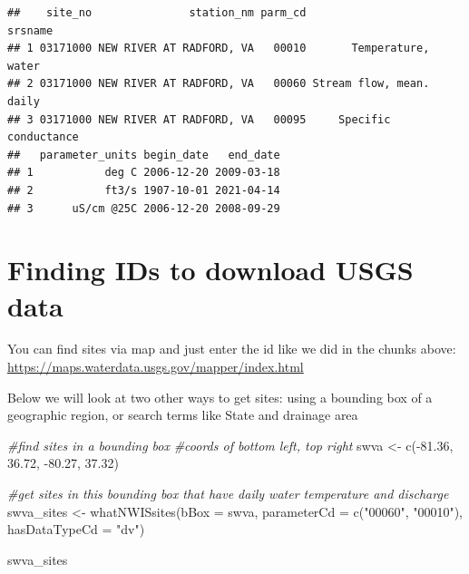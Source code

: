 \documentclass[
]{book}
\newenvironment{Shaded}{\begin{snugshade}}{\end{snugshade}}
\newcommand{\AttributeTok}[1]{\textcolor[rgb]{0.77,0.63,0.00}{#1}}
\newcommand{\CommentTok}[1]{\textcolor[rgb]{0.56,0.35,0.01}{\textit{#1}}}
\newcommand{\FloatTok}[1]{\textcolor[rgb]{0.00,0.00,0.81}{#1}}
\newcommand{\FunctionTok}[1]{\textcolor[rgb]{0.00,0.00,0.00}{#1}}
\newcommand{\NormalTok}[1]{#1}
\newcommand{\OtherTok}[1]{\textcolor[rgb]{0.56,0.35,0.01}{#1}}
\newcommand{\SpecialCharTok}[1]{\textcolor[rgb]{0.00,0.00,0.00}{#1}}
\newcommand{\StringTok}[1]{\textcolor[rgb]{0.31,0.60,0.02}{#1}}
\begin{document}
\begin{verbatim}
##    site_no               station_nm parm_cd                  srsname
## 1 03171000 NEW RIVER AT RADFORD, VA   00010       Temperature, water
## 2 03171000 NEW RIVER AT RADFORD, VA   00060 Stream flow, mean. daily
## 3 03171000 NEW RIVER AT RADFORD, VA   00095     Specific conductance
##   parameter_units begin_date   end_date
## 1           deg C 2006-12-20 2009-03-18
## 2           ft3/s 1907-10-01 2021-04-14
## 3      uS/cm @25C 2006-12-20 2008-09-29
\end{verbatim}

\hypertarget{finding-ids-to-download-usgs-data}{%
\section{Finding IDs to download USGS data}\label{finding-ids-to-download-usgs-data}}

You can find sites via map and just enter the id like we did in the chunks above: \url{https://maps.waterdata.usgs.gov/mapper/index.html}

Below we will look at two other ways to get sites: using a bounding box of a geographic region, or search terms like State and drainage area

\begin{Shaded}
\begin{Highlighting}[]
\CommentTok{\#find sites in a bounding box}
\CommentTok{\#coords of bottom left, top right}
\NormalTok{swva }\OtherTok{\textless{}{-}} \FunctionTok{c}\NormalTok{(}\SpecialCharTok{{-}}\FloatTok{81.36}\NormalTok{, }\FloatTok{36.72}\NormalTok{, }\SpecialCharTok{{-}}\FloatTok{80.27}\NormalTok{, }\FloatTok{37.32}\NormalTok{)}

\CommentTok{\#get sites in this bounding box that have daily water temperature and discharge}
\NormalTok{swva\_sites }\OtherTok{\textless{}{-}} \FunctionTok{whatNWISsites}\NormalTok{(}\AttributeTok{bBox =}\NormalTok{ swva, }
                            \AttributeTok{parameterCd =} \FunctionTok{c}\NormalTok{(}\StringTok{"00060"}\NormalTok{, }\StringTok{"00010"}\NormalTok{), }
                            \AttributeTok{hasDataTypeCd =} \StringTok{"dv"}\NormalTok{)}

\NormalTok{swva\_sites}
\end{Highlighting}
\end{Shaded}
\end{document}
